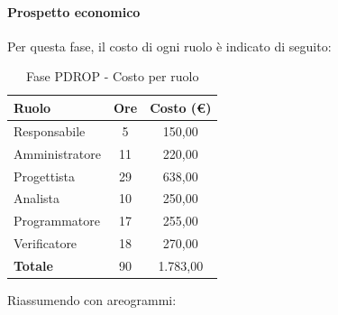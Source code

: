 \documentclass[../PianoProgetto.tex]{subfiles}
\begin{document}
	\paragraph{Prospetto economico}
					Per questa fase, il costo di ogni ruolo è indicato di seguito:
	\begin{table}[h]
		\centering
	
		\begin{tabular}{l * {2}{c}}
			\toprule
			\textbf{Ruolo} & \textbf{Ore} & \textbf{Costo (\euro{})} \\
			\midrule
			Responsabile &	5 & 150,00 \\
			Amministratore & 11 & 220,00 \\
			Progettista & 29 & 638,00 \\
			Analista & 10 & 250,00 \\
			Programmatore & 17 & 255,00 \\
			Verificatore & 18 & 270,00 \\
			\midrule		
			\textbf{Totale} & 90 & 1.783,00 \\
			\bottomrule
		\end{tabular}
		\caption{Fase PDROP - Costo per ruolo}
		\label{tab:fasePDROP_costo}
	\end{table}
\vfill	
\newpage
\vfill	
	Riassumendo con areogrammi:
\end{document}
